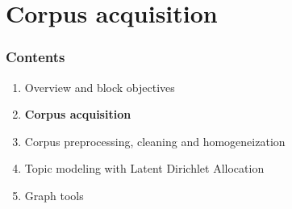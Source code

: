 \documentclass{beamer}
\begin{document}
\section{Corpus acquisition}

\begin{frame}

    \frametitle{Contents}

	\large

    \begin{enumerate}
  
    	\item {Overview and block objectives}
    	\item {\bf \color{blue}Corpus acquisition}
    	\item Corpus preprocessing, cleaning and homogeneization
    	\item Topic modeling with Latent Dirichlet Allocation
    	\item Graph tools
    
    \end{enumerate}

\end{frame}
\end{document}
